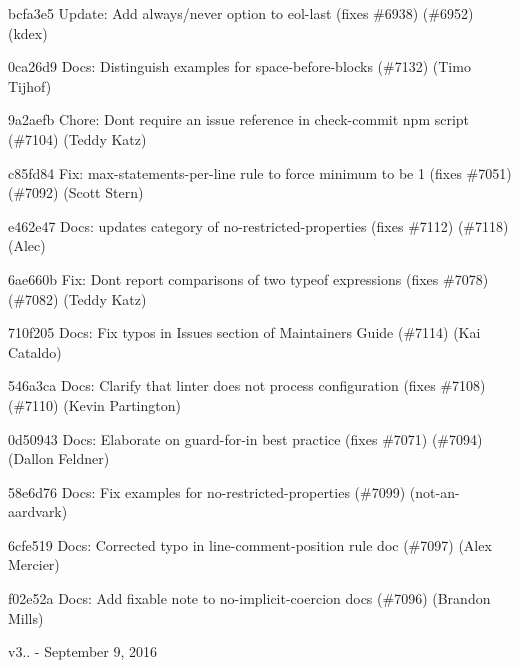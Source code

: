 \begin{DoxyItemize}
\item bcfa3e5 Update\+: Add {\ttfamily always}/{\ttfamily never} option to {\ttfamily eol-\/last} (fixes \#6938) (\#6952) (kdex)
\item 0ca26d9 Docs\+: Distinguish examples for space-\/before-\/blocks (\#7132) (Timo Tijhof)
\item 9a2aefb Chore\+: Don\textquotesingle{}t require an issue reference in check-\/commit npm script (\#7104) (Teddy Katz)
\item c85fd84 Fix\+: max-\/statements-\/per-\/line rule to force minimum to be 1 (fixes \#7051) (\#7092) (Scott Stern)
\item e462e47 Docs\+: updates category of no-\/restricted-\/properties (fixes \#7112) (\#7118) (Alec)
\item 6ae660b Fix\+: Don\textquotesingle{}t report comparisons of two typeof expressions (fixes \#7078) (\#7082) (Teddy Katz)
\item 710f205 Docs\+: Fix typos in Issues section of Maintainer\textquotesingle{}s Guide (\#7114) (Kai Cataldo)
\item 546a3ca Docs\+: Clarify that linter does not process configuration (fixes \#7108) (\#7110) (Kevin Partington)
\item 0d50943 Docs\+: Elaborate on {\ttfamily guard-\/for-\/in} best practice (fixes \#7071) (\#7094) (Dallon Feldner)
\item 58e6d76 Docs\+: Fix examples for no-\/restricted-\/properties (\#7099) (not-\/an-\/aardvark)
\item 6cfe519 Docs\+: Corrected typo in line-\/comment-\/position rule doc (\#7097) (Alex Mercier)
\item f02e52a Docs\+: Add fixable note to no-\/implicit-\/coercion docs (\#7096) (Brandon Mills)
\end{DoxyItemize}

v3.. -\/ September 9, 2016


